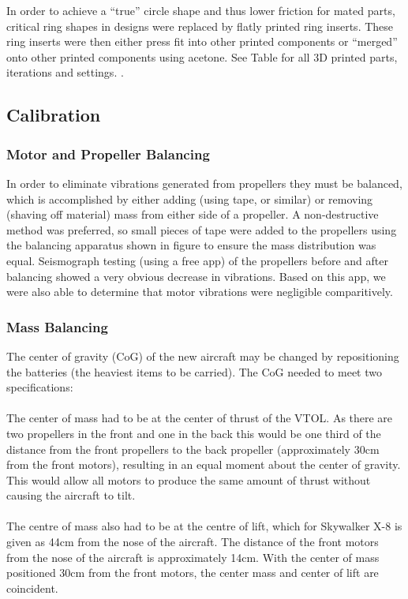 In order to achieve a ``true'' circle shape and thus lower friction for mated parts, critical ring shapes in designs were replaced by flatly printed ring inserts. These ring inserts were then either press fit into other printed components or ``merged'' onto other printed components using acetone. See Table \red{[REF]} for all 3D printed parts, iterations and settings.  .

\subsection{Calibration}
\subsubsection*{Motor and Propeller Balancing}
In order to eliminate vibrations generated from propellers they must be balanced, which is accomplished by either adding (using tape, or similar) or removing (shaving off material) mass from either side of a propeller. A non-destructive method was preferred, so small pieces of tape were added to the propellers using the balancing apparatus shown in figure  to ensure the mass distribution was equal.  Seismograph testing (using a free app) of the propellers before and after balancing showed a very obvious decrease in vibrations. Based on this app, we were also able to determine that motor vibrations were negligible comparitively.\\

\subsubsection*{Mass Balancing}
The center of gravity (CoG) of the new aircraft may be changed by repositioning the batteries (the heaviest items to be carried). The CoG needed to meet two specifications:
	\\\\The center of mass had to be at the center of thrust of the VTOL. As there are two propellers in the front and one in the back this would be one third of the distance from the front propellers to the back propeller (approximately 30cm from the front motors), resulting in an equal moment about the center of gravity. This would allow all motors to produce the same amount of thrust without causing the aircraft to tilt.
	\\\\The centre of mass also had to be at the centre of lift, which for Skywalker X-8 is given as 44cm from the nose of the aircraft. The distance of the front motors from the nose of the aircraft is approximately 14cm. With the center of mass positioned 30cm from the front motors, the center mass and center of lift are coincident.
	

